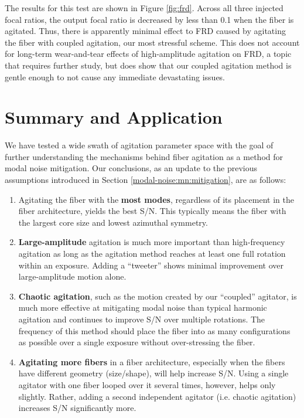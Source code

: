 The results for this test are shown in Figure {\ref{fig:frd}}. Across all three injected focal ratios, the output focal ratio is decreased by less than 0.1 when the fiber is agitated. Thus, there is apparently minimal effect to FRD caused by agitating the fiber with coupled agitation, our most stressful scheme. This does not account for long-term wear-and-tear effects of high-amplitude agitation on FRD, a topic that requires further study, but does show that our coupled agitation method is gentle enough to not cause any immediate devastating issues.

\section{Summary and Application}
\label{modal-noise:conclusions}

We have tested a wide swath of agitation parameter space with the goal of further understanding the mechanisms behind fiber agitation as a method for modal noise mitigation. Our conclusions, as an update to the previous assumptions introduced in Section \ref{modal-noise:mn:mitigation}, are as follows:
\begin{enumerate}
\item Agitating the fiber with the \textbf{most modes}, regardless of its placement in the fiber architecture, yields the best S/N. This typically means the fiber with the largest core size and lowest azimuthal symmetry.
\item \textbf{Large-amplitude} agitation is much more important than high-frequency agitation as long as the agitation method reaches at least one full rotation within an exposure. Adding a ``tweeter'' shows minimal improvement over large-amplitude motion alone.
\item \textbf{Chaotic agitation}, such as the motion created by our ``coupled'' agitator, is much more effective at mitigating modal noise than typical harmonic agitation and continues to improve S/N over multiple rotations. The frequency of this method should place the fiber into as many configurations as possible over a single exposure without over-stressing the fiber.
\item \textbf{Agitating more fibers} in a fiber architecture, especially when the fibers have different geometry (size/shape), will help increase S/N. Using a single agitator with one fiber looped over it several times, however, helps only slightly. Rather, adding a second independent agitator (i.e. chaotic agitation) increases S/N significantly more.
\end{enumerate}


